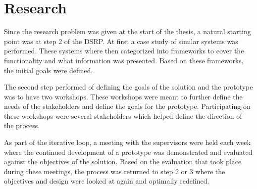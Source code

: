 \section{Research} %
\label{sec:workshops}
Since the research problem was given at the start of the thesis, a natural
starting point was at step 2 of the DSRP. At first a case study of similar 
systems was performed. These systems where then categorized into frameworks to 
cover the functionality and what information was presented. Based on these 
frameworks, the initial goals were defined.

The second step performed of defining the goals of the solution and the
prototype was to have two workshops. These workshops were meant to further 
define the needs of the stakeholders and define the goals for the prototype.
Participating on these workshops were several stakeholders which helped define
the direction of the process.

As part of the iterative loop, a meeting with the supervisors were held each 
week where the continued development of a prototype was demonstrated and 
evaluated against the objectives of the solution. Based on the evaluation that 
took place during these meetings, the process was returned to step 2 or 3 
where the objectives and design were looked at again and optimally redefined.



